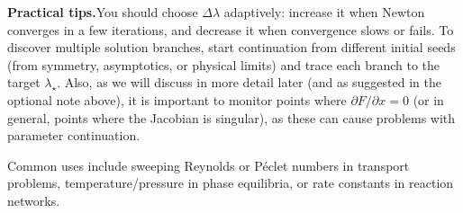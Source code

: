 \textbf{Practical tips.}\quad You should choose $\Delta\lambda$ adaptively: increase it when Newton converges in a few iterations, and decrease it when convergence slows or fails. To discover multiple solution branches, start continuation from different initial seeds (from symmetry, asymptotics, or physical limits) and trace each branch to the target $\lambda_\star$. Also, as we will discuss in more detail later (and as suggested in the optional note above), it is important to monitor points where $\partial F/\partial x=0$ (or in general, points where the Jacobian is singular), as these can cause problems with parameter continuation.

Common uses include sweeping Reynolds or P\'eclet numbers in transport problems, temperature/pressure in phase equilibria, or rate constants in reaction networks.

